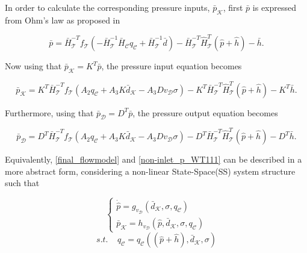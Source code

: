In order to calculate the corresponding pressure inputs, $\bar{p}_{\mathcal{K}}$, first $\bar{p}$ is expressed from Ohm's law as proposed in 

\begin{equation}
  \label{non-inlet_p_WT}
  \bar{p} =  \bar{H}^{-T}_{\mathcal{T}}f_{\mathcal{T}}(-\bar{H}^{-1}_{\mathcal{T}} \bar{H}_{\mathcal{C}} q_\mathcal{C} + \bar{H}^{-1}_{\mathcal{T}} \bar{d}) - \bar{H}^{-T}_{\mathcal{T}}\hat{H}^{T}_{\mathcal{T}} (\hat{p} + \hat{h}) - \bar{h} .
\end{equation}

Now using that $\bar{p}_{\mathcal{K}} = K^T \bar{p} $, the pressure input equation becomes

\begin{equation}
  \label{non-inlet_p_WT1}
  \bar{p}_{\mathcal{K}} = K^T \bar{H}^{-T}_{\mathcal{T}}f_{\mathcal{T}}(A_2 q_\mathcal{C} + A_3 K \bar{d}_{\mathcal{K}} - A_3 D v_{\mathcal{D}} \sigma) - K^T\bar{H}^{-T}_{\mathcal{T}}\hat{H}^{T}_{\mathcal{T}} (\hat{p} + \hat{h}) - K^T\bar{h} .
\end{equation}

Furthermore, using that $\bar{p}_{\mathcal{D}} = D^T \bar{p} $, the pressure output equation becomes

\begin{equation}
  \label{non-inlet_p_WT111}
  \bar{p}_{\mathcal{D}} = D^T \bar{H}^{-T}_{\mathcal{T}}f_{\mathcal{T}}(A_2 q_\mathcal{C} + A_3 K \bar{d}_{\mathcal{K}} - A_3 D v_{\mathcal{D}} \sigma) - D^T\bar{H}^{-T}_{\mathcal{T}}\hat{H}^{T}_{\mathcal{T}} (\hat{p} + \hat{h}) - D^T\bar{h}.
\end{equation}

Equivalently, \eqref{final_flowmodel} and \eqref{non-inlet_p_WT111} can be described in a more abstract form, considering a non-linear State-Space(SS) system structure such that

\begin{equation}
\label{final_flowmodel_abstract}
\begin{cases}
    \dot{\hat{p}} = g_{v_{\mathcal{D}}}( \bar{d}_{\mathcal{K}}, \sigma, q_\mathcal{C})\\
    \bar{p}_{\mathcal{K}} =h_{v_{\mathcal{D}}}(\hat{p}, \bar{d}_{\mathcal{K}}, \sigma, q_\mathcal{C})
\end{cases}
\end{equation}
\begin{equation*}
s.t. \:\:\:\:\: q_\mathcal{C} = q_\mathcal{C}((\hat{p}+\hat{h}), \bar{d}_{\mathcal{K}}, \sigma)
\end{equation*}

